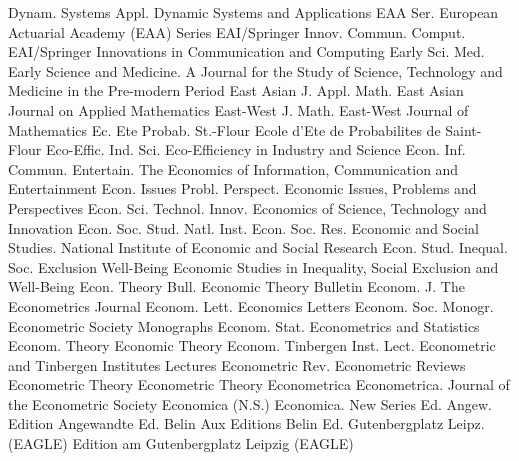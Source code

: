 {Dynam. Systems Appl.}
{Dynamic Systems and Applications}
{EAA Ser.}
{European Actuarial Academy (EAA) Series}
{EAI/Springer Innov. Commun. Comput.}
{EAI/Springer Innovations in Communication and Computing}
{Early Sci. Med.}
{Early Science and Medicine. A Journal for the Study of Science, Technology and Medicine in the Pre-modern Period}
{East Asian J. Appl. Math.}
{East Asian Journal on Applied Mathematics}
{East-West J. Math.}
{East-West Journal of Mathematics}
{Ec. Ete Probab. St.-Flour}
{Ecole d'Ete de Probabilites de Saint-Flour}
{Eco-Effic. Ind. Sci.}
{Eco-Efficiency in Industry and Science}
{Econ. Inf. Commun. Entertain.}
{The Economics of Information, Communication and Entertainment}
{Econ. Issues Probl. Perspect.}
{Economic Issues, Problems and Perspectives}
{Econ. Sci. Technol. Innov.}
{Economics of Science, Technology and Innovation}
{Econ. Soc. Stud. Natl. Inst. Econ. Soc. Res.}
{Economic and Social Studies. National Institute of Economic and Social Research}
{Econ. Stud. Inequal. Soc. Exclusion Well-Being}
{Economic Studies in Inequality, Social Exclusion and Well-Being}
{Econ. Theory Bull.}
{Economic Theory Bulletin}
{Econom. J.}
{The Econometrics Journal}
{Econom. Lett.}
{Economics Letters}
{Econom. Soc. Monogr.}
{Econometric Society Monographs}
{Econom. Stat.}
{Econometrics and Statistics}
{Econom. Theory}
{Economic Theory}
{Econom. Tinbergen Inst. Lect.}
{Econometric and Tinbergen Institutes Lectures}
{Econometric Rev.}
{Econometric Reviews}
{Econometric Theory}
{Econometric Theory}
{Econometrica}
{Econometrica. Journal of the Econometric Society}
{Economica (N.S.)}
{Economica. New Series}
{Ed. Angew.}
{Edition Angewandte}
{Ed. Belin}
{Aux Editions Belin}
{Ed. Gutenbergplatz Leipz. (EAGLE)}
{Edition am Gutenbergplatz Leipzig (EAGLE)}
